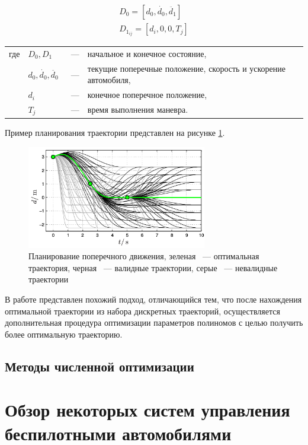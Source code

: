 \begin{eqnarray}
    D_0 = [d_0, \dot{d_0}, \ddot{d_1}] \\
    D_{1_{ij}} = [d_i, 0, 0, T_j]
\end{eqnarray}

\noindent\begin{tabularx}{\linewidth}{lllX}
    где & $D_0, D_1$                    &~---& начальное и конечное состояние, \\
        & $d_0, \dot{d_0}, \ddot{d_0}$  &~---& текущие поперечные положение, скорость и ускорение автомобиля,\\
        & $d_i$                         &~---& конечное поперечное положение,\\
        & $T_j$                         &~---& время выполнения маневра.
\end{tabularx}

Пример планирования траектории представлен на рисунке \ref{img:junior_plane}.

\begin{figure}[h]
    \centering
    \includegraphics[width=0.7\textwidth]{images/junior_plane}
    \caption{Планирование поперечного движения, зеленая ~--- оптимальная траектория, черная ~--- валидные траектории,
        серые ~--- невалидные траектории}
    \label{img:junior_plane}
\end{figure}

В работе \cite{motion_planning_path_optimization} представлен похожий подход, отличающийся тем, что после нахождения
оптимальной траектории из набора дискретных траекторий, осуществляется дополнительная процедура оптимизации параметров
полиномов с целью получить более оптимальную траекторию.

\subsection{Методы численной оптимизации}

\section{Обзор некоторых систем управления беспилотными автомобилями}
